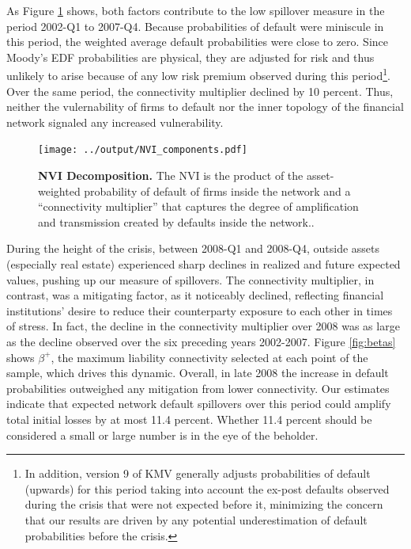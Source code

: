 As Figure \ref{fig:NVI_components} shows, both factors contribute to the low spillover measure in the period 2002-Q1 to 2007-Q4. Because probabilities of default were miniscule in this period, the weighted average default probabilities were close to zero. Since Moody's EDF  probabilities are physical, they are adjusted for risk and thus unlikely to arise because of any low risk premium observed during this period\footnote{In addition, version 9 of KMV generally adjusts probabilities of default (upwards) for this period taking into account the ex-post defaults observed during the crisis that were not expected before it, minimizing the concern that our results are driven by any potential underestimation of default probabilities before the crisis.}. Over the same period, the connectivity multiplier declined by 10 percent. Thus, neither the vulernability of firms to default nor the inner topology of the financial network signaled any increased vulnerability.

\begin{figure}[h!]
\begin{center}
\texttt{[image: ../output/NVI\_components.pdf]}
\end{center}
\caption[]{\textbf{NVI Decomposition.} The NVI is the product of the asset-weighted probability of default of firms inside the network and a ``connectivity multiplier'' that captures the degree of amplification and transmission created by defaults inside the network..} \label{fig:NVI_components}
\end{figure}

During the height of the crisis, between 2008-Q1 and 2008-Q4, outside assets (especially real estate) experienced sharp declines in realized and future expected values, pushing up our measure of spillovers. The connectivity multiplier, in contrast, was a mitigating factor, as it noticeably declined, reflecting financial institutions’ desire to reduce their counterparty exposure to each other in times of stress. In fact, the decline in the connectivity multiplier over 2008 was as large as the decline observed over the six preceding years 2002-2007. Figure \ref{fig:betas} shows $\beta^+$, the maximum liability connectivity selected at each point of the sample, which drives this dynamic. Overall, in late 2008 the increase in default probabilities outweighed any mitigation from lower connectivity. Our estimates indicate that expected network default spillovers over this period could amplify total initial losses by at most 11.4 percent. Whether 11.4 percent should be considered a small or large number is in the eye of the beholder.

